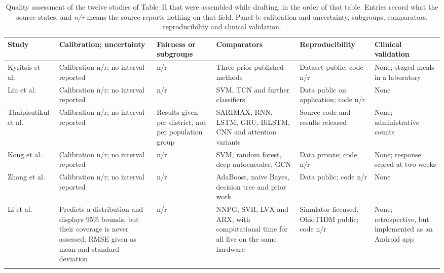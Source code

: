 \documentclass[journal]{IEEEtran}
\renewcommand{\thetable}{S\arabic{table}}
\begin{document}
\begin{table}[tbp]
\centering
\addtocounter{table}{-1}
\renewcommand{\thetable}{S3b}
\caption{Quality assessment of the twelve studies of Table~II that were assembled while drafting,
in the order of that table. Entries record what the source states, and \emph{n/r}
means the source reports nothing on that field. Panel b: calibration and uncertainty, subgroups, comparators, reproducibility and clinical validation.}
\label{tab:S3b}
\footnotesize
\setlength{\tabcolsep}{2.5pt}
\renewcommand{\arraystretch}{1.05}
\begin{tabularx}{\textwidth}{L{2.5cm} L{3.4cm} L{2.2cm} L{2.8cm} L{2.3cm} X}
\toprule
\textbf{Study} & \textbf{Calibration; uncertainty} & \textbf{Fairness or subgroups} & \textbf{Comparators} & \textbf{Reproducibility} & \textbf{Clinical validation} \\
\midrule
Kyritsis et al.~\cite{Kyritsis2019EatingBehavior} & Calibration n/r; no interval reported & n/r & Three prior published methods & Dataset public; code n/r & None; staged meals in a laboratory \\
\addlinespace[2pt]
Liu et al.~\cite{2} & Calibration n/r; no interval reported & n/r & SVM, TCN and further classifiers & Data public on application; code n/r & None \\
\addlinespace[2pt]
Thaipisutikul et al.~\cite{3} & Calibration n/r; no interval reported & Results given per district, not per population group & SARIMAX, RNN, LSTM, GRU, BiLSTM, CNN and attention variants & Source code and results released & None; administrative counts \\
\addlinespace[2pt]
Kong et al.~\cite{4} & Calibration n/r; no interval reported & n/r & SVM, random forest, deep autoencoder, GCN & Data private; code n/r & None; response scored at two weeks \\
\addlinespace[2pt]
Zhang et al.~\cite{9} & Calibration n/r; no interval reported & n/r & AdaBoost, naive Bayes, decision tree and prior work & Data public; code n/r & None \\
\addlinespace[2pt]
Li et al.~\cite{Li2020GluNet} & Predicts a distribution and displays 95\% bounds, but their coverage is never assessed; RMSE given as mean and standard deviation & n/r & NNPG, SVR, LVX and ARX, with computational time for all five on the same hardware & Simulator licensed, OhioT1DM public; code n/r & None; retrospective, but implemented as an Android app \\
\addlinespace[2pt]

\end{tabularx}
\end{table}
\end{document}
